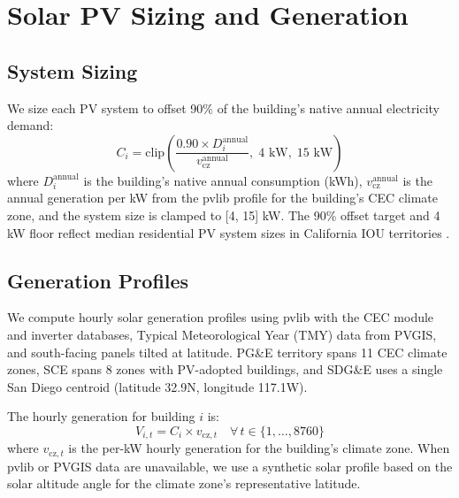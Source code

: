 \documentclass[11pt]{article}
\begin{document}
\section{Solar PV Sizing and Generation}
\label{sec:solar}

\subsection{System Sizing}

We size each PV system to offset 90\% of the building's native annual electricity demand:
\begin{equation}
C_i = \text{clip}\!\left(\frac{0.90 \times D_i^{\text{annual}}}{v_{\text{cz}}^{\text{annual}}},\; 4 \text{ kW},\; 15 \text{ kW}\right)
\end{equation}
where $D_i^{\text{annual}}$ is the building's native annual consumption (kWh), $v_{\text{cz}}^{\text{annual}}$ is the annual generation per kW from the pvlib profile for the building's CEC climate zone, and the system size is clamped to [4, 15] kW. The 90\% offset target and 4 kW floor reflect median residential PV system sizes in California IOU territories \cite{barbose2023}.

\subsection{Generation Profiles}

We compute hourly solar generation profiles using pvlib \cite{pvlib2018} with the CEC module and inverter databases, Typical Meteorological Year (TMY) data from PVGIS, and south-facing panels tilted at latitude. PG\&E territory spans 11 CEC climate zones, SCE spans 8 zones with PV-adopted buildings, and SDG\&E uses a single San Diego centroid (latitude 32.9\textdegree N, longitude 117.1\textdegree W).

The hourly generation for building $i$ is:
\begin{equation}
V_{i,t} = C_i \times v_{\text{cz},t} \quad \forall\, t \in \{1, \ldots, 8760\}
\end{equation}
where $v_{\text{cz},t}$ is the per-kW hourly generation for the building's climate zone. When pvlib or PVGIS data are unavailable, we use a synthetic solar profile based on the solar altitude angle for the climate zone's representative latitude.
\end{document}
